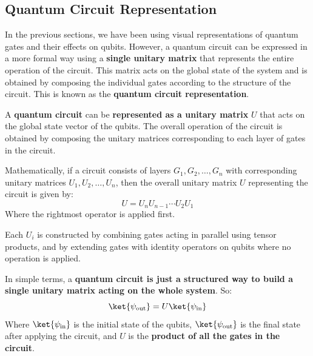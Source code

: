 \subsection{Quantum Circuit Representation}

In the previous sections, we have been using visual representations of quantum gates and their effects on qubits. However, a quantum circuit can be expressed in a more formal way using a \textbf{single unitary matrix} that represents the entire operation of the circuit. This matrix acts on the global state of the system and is obtained by composing the individual gates according to the structure of the circuit. This is known as the \textbf{quantum circuit representation}.

\begin{definitionbox}
    A \textbf{quantum circuit} can be \textbf{represented as a unitary matrix} $U$ that acts on the global state vector of the qubits. The overall operation of the circuit is obtained by composing the unitary matrices corresponding to each layer of gates in the circuit.

    \highspace
    Mathematically, if a circuit consists of layers $G_1, G_2, \ldots, G_n$ with corresponding unitary matrices $U_1, U_2, \ldots, U_n$, then the overall unitary matrix $U$ representing the circuit is given by:
    \begin{equation*}
        U = U_n U_{n-1} \cdots U_2 U_1
    \end{equation*}
    Where the rightmost operator is applied first.

    \highspace
    Each $U_i$ is constructed by combining gates acting in parallel using tensor products, and by extending gates with identity operators on qubits where no operation is applied.
\end{definitionbox}

\noindent
In simple terms, a \textbf{quantum circuit is just a structured way to build a single unitary matrix acting on the whole system}. So:
\begin{equation*}
    \ket{\psi_{\text{out}}} = U \ket{\psi_{\text{in}}}
\end{equation*}
Where $\ket{\psi_{\text{in}}}$ is the initial state of the qubits, $\ket{\psi_{\text{out}}}$ is the final state after applying the circuit, and $U$ is the \textbf{product of all the gates in the circuit}.

